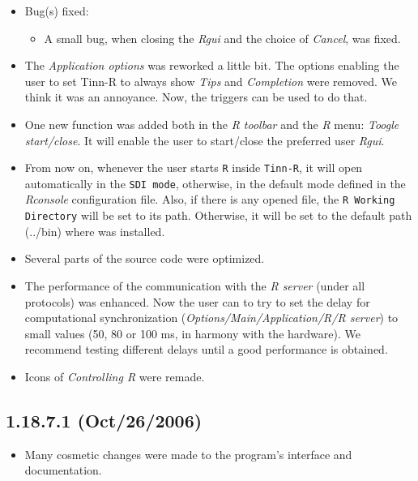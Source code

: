 \begin{itemize}
  \item Bug(s) fixed:
    \begin{itemize}
      \item A small bug, when closing the \textit{Rgui} and the choice
        of \textit{Cancel}, was fixed.
    \end{itemize}
  \item The \textit{Application options} was reworked a little bit. The
    options enabling the user to set Tinn-R to always show \textit{Tips}
    and \textit{Completion} were removed. We think it was an annoyance.
    Now, the triggers can be used to do that.
  \item One new function was added both in the \textit{R toolbar} and the
    \textit{R} menu: \textit{Toogle start/close}. It will enable the user
    to start/close the preferred user \textit{Rgui}.
  \item From now on, whenever the user starts \texttt{R} inside
    \texttt{Tinn-R}, it will open automatically in the \texttt{SDI mode},
    otherwise, in the default mode defined in the \textit{Rconsole}
    configuration file. Also, if there is any opened file, the
    \texttt{R Working Directory} will be set to its path. Otherwise,
    it will be set to the default path (../bin) where \RR{} was installed.
  \item Several parts of the source code were optimized.
  \item The performance of the communication with the \textit{R server}
    (under all protocols) was enhanced. Now the user can to try to set
    the delay for computational synchronization
    (\textit{Options/Main/Application/R/R server}) to small values
    (50, 80 or 100 ms, in harmony with the hardware). We recommend
    testing different delays until a good performance is obtained.
  \item Icons of \textit{Controlling R} were remade.
\end{itemize}


\subsection{1.18.7.1 (Oct/26/2006)}

\begin{itemize}
  \item Many cosmetic changes were made to the program's interface
    and documentation.
\end{itemize}


